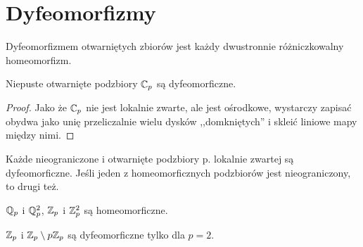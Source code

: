 \section{Dyfeomorfizmy}
\begin{definicja}
	Dyfeomorfizmem otwarniętych zbiorów jest każdy dwustronnie różniczkowalny homeomorfizm.
\end{definicja}

\begin{fakt}
	Niepuste  otwarnięte podzbiory $\mathbb C_p$ są dyfeomorficzne.
\end{fakt}

\begin{proof}
	Jako że $\mathbb C_p$ nie jest lokalnie zwarte, ale jest ośrodkowe, wystarczy zapisać obydwa jako unię przeliczalnie wielu dysków ,,domkniętych'' i skleić liniowe mapy między nimi.
\end{proof}

\begin{fakt}
	Każde  nieograniczone i otwarnięte podzbiory p. lokalnie zwartej są dyfeomorficzne.
	Jeśli jeden z homeomorficznych podzbiorów jest nieograniczony, to drugi też.
\end{fakt}

\begin{fakt}[,,Peano'']
	$\mathbb Q_p$  i $\mathbb Q_p^2$, $\mathbb Z_p$ i $\mathbb Z_p^2$ są homeomorficzne.
\end{fakt}

\begin{fakt}
	$\mathbb Z_p$ i $\mathbb Z_p \setminus p \mathbb Z_p$ są dyfeomorficzne tylko dla $p = 2$.
\end{fakt}
